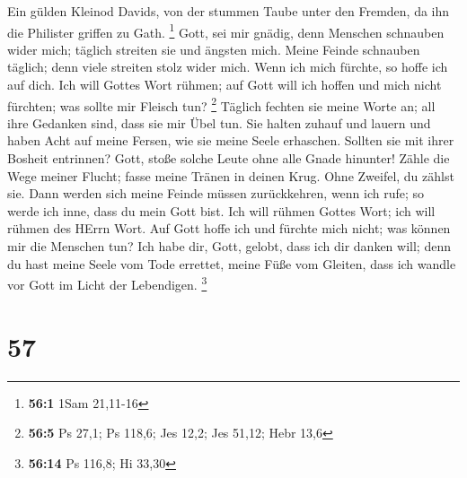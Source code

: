  Ein gülden Kleinod Davids, von der stummen Taube unter den
Fremden, da ihn die Philister griffen zu Gath. \footnote{\textbf{56:1}
  1Sam 21,11-16}  Gott, sei mir gnädig, denn Menschen
schnauben wider mich; täglich streiten sie und ängsten mich.
 Meine Feinde schnauben täglich; denn viele streiten stolz
wider mich.  Wenn ich mich fürchte, so hoffe ich auf dich.
 Ich will Gottes Wort rühmen; auf Gott will ich hoffen und
mich nicht fürchten; was sollte mir Fleisch tun? \footnote{\textbf{56:5}
  Ps 27,1; Ps 118,6; Jes 12,2; Jes 51,12; Hebr 13,6} 
Täglich fechten sie meine Worte an; all ihre Gedanken sind, dass sie mir
Übel tun.  Sie halten zuhauf und lauern und haben Acht auf
meine Fersen, wie sie meine Seele erhaschen.  Sollten sie
mit ihrer Bosheit entrinnen? Gott, stoße solche Leute ohne alle Gnade
hinunter!  Zähle die Wege meiner Flucht; fasse meine Tränen
in deinen Krug. Ohne Zweifel, du zählst sie.  Dann werden
sich meine Feinde müssen zurückkehren, wenn ich rufe; so werde ich inne,
dass du mein Gott bist.  Ich will rühmen Gottes Wort; ich
will rühmen des HErrn Wort.  Auf Gott hoffe ich und fürchte
mich nicht; was können mir die Menschen tun?  Ich habe dir,
Gott, gelobt, dass ich dir danken will;  denn du hast meine
Seele vom Tode errettet, meine Füße vom Gleiten, dass ich wandle vor
Gott im Licht der Lebendigen. \footnote{\textbf{56:14} Ps 116,8; Hi
  33,30}

\hypertarget{section-23}{%
\section{57}\label{section-23}}

